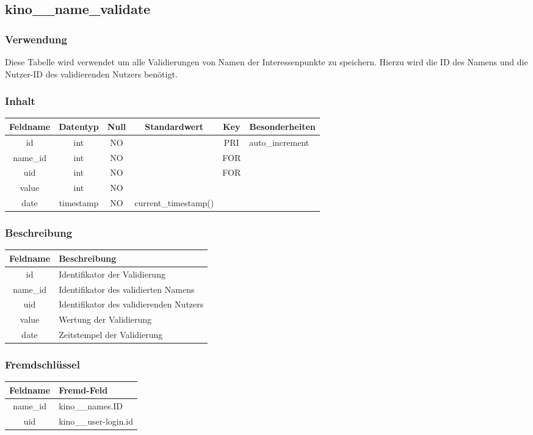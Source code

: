 \subsection{kino\_\_name\_validate}
\subsubsection{Verwendung} Diese Tabelle wird verwendet um alle Validierungen von Namen der Interessenpunkte zu speichern. Hierzu wird die ID des Namens und die Nutzer-ID des validierenden Nutzers benötigt.
\subsubsection{Inhalt}
\begin{table}[H]
	\begin{tabular}{|c|c|c|c|c|p{3.5cm}|}
		\hline
		\textbf{Feldname} & \textbf{Datentyp} & \textbf{Null} & \textbf{Standardwert} & \textbf{Key}   & \textbf{Besonderheiten} \\ \hline
		id & int & NO &  & PRI & auto\_increment \\ \hline
		name\_id & int & NO &  & FOR & \\ \hline
		uid & int & NO &  & FOR & \\ \hline
		value & int & NO &  &  & \\ \hline
		date & timestamp & NO & current\_timestamp() &  & \\ \hline
	\end{tabular}
\end{table}
\subsubsection{Beschreibung}
\begin{table}[H]
	\begin{tabular}{|c|p{12cm}|}
		\hline
		\textbf{Feldname} & \textbf{Beschreibung} \\ \hline
		id & Identifikator der Validierung \\ \hline
		name\_id & Identifikator des validierten Namens \\ \hline
		uid & Identifikator des validierenden Nutzers \\ \hline
		value & Wertung der Validierung \\ \hline
		date & Zeitstempel der Validierung \\ \hline
	\end{tabular}
\end{table}
\subsubsection{Fremdschlüssel}
\begin{table}[H]
	\begin{tabular}{|c|p{12.5cm}|}
		\hline
		\textbf{Feldname} & \textbf{Fremd-Feld} \\ \hline
		name\_id & kino\_\_names.ID \\ \hline
		uid & kino\_\_user-login.id \\ \hline
	\end{tabular}
\end{table}
